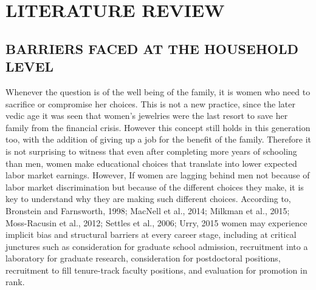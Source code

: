 \documentclass[12pt]{article}
\begin{document}
\section{LITERATURE REVIEW}
\subsection{BARRIERS FACED AT THE HOUSEHOLD LEVEL
}
Whenever the question is of the well being of the family, it is women who need to sacrifice or
compromise her choices. This is not a new practice, since the later vedic age it was seen that
women’s jewelries were the last resort to save her family from the financial crisis. However
this concept still holds in this generation too, with the addition of giving up a job for the
benefit of the family. Therefore it is not surprising to witness that even after completing more
years of schooling than men, women make educational choices that translate into lower
expected labor market earnings. However, If women are lagging behind men not because of
labor market discrimination but because of the different choices they make, it is key to
understand why they are making such different choices. According to, Bronstein and
Farnsworth, 1998; MacNell et al., 2014; Milkman et al., 2015; Moss-Racusin et al., 2012;
Settles et al., 2006; Urry, 2015 women may experience implicit bias and structural barriers at
every career stage, including at critical junctures such as consideration for graduate school
admission, recruitment into a laboratory for graduate research, consideration for postdoctoral
positions, recruitment to fill tenure-track faculty positions, and evaluation for promotion in
rank.
\end{document}
